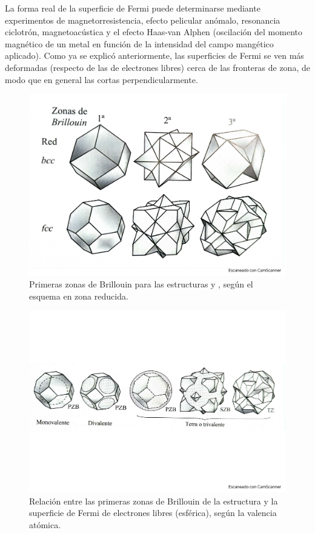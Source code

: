 La forma real de la superficie de Fermi puede determinarse mediante experimentos de magnetorresistencia, efecto pelicular anómalo, resonancia ciclotrón, magnetoacústica y el efecto Haas-van Alphen (oscilación del momento magnético de un metal en función de la intensidad del campo mangético aplicado). Como ya se explicó anteriormente, las superficies de Fermi se ven más deformadas (respecto de las de electrones libres) cerca de las fronteras de zona, de modo que en general las cortas perpendicularmente.

\begin{figure}[h!] \centering
	\includegraphics[scale=0.35]{Cuerpo/Ch_07/Fotos libro 8.pdf}
	\caption{Primeras zonas de Brillouin para las estructuras \bcc y \fcc, según el esquema en zona reducida.} 
	\label{Fig:07-08}
\end{figure}    
\begin{figure}[h!] \centering
	\includegraphics[scale=0.45]{Cuerpo/Ch_07/Fotos libro 9.pdf}
	\caption{Relación entre las primeras zonas de Brillouin de la estructura \fcc y la superficie de Fermi de electrones libres (esférica), según la valencia atómica.}
	\label{Fig:07-09}
\end{figure}    


